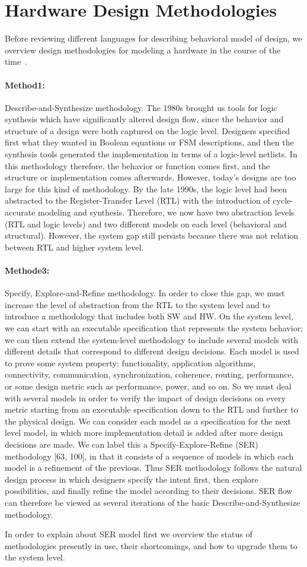 \section{Hardware Design Methodologies}

Before reviewing different languages for describing behavioral model of design, we overview design methodologies for modeling a hardware in the course of the time~\cite{michel_2012_synthesis}.

\paragraph{Method1:} Describe-and-Synthesize methodology.
The 1980s brought us tools for logic synthesis which have significantly altered design flow, since the behavior and structure of a design were both captured on the logic level.
Designers specified first what they wanted in Boolean equations or FSM descriptions, and then the synthesis tools generated the implementation in terms of a logic-level netlists.
In this methodology therefore, the behavior or function comes first, and the structure or implementation comes afterwards.
However, today’s designs are too large for this kind of methodology.
By the late 1990s, the logic level had been abstracted to the Register-Transfer Level (RTL) with the introduction of cycle-accurate modeling and synthesis.
Therefore, we now have two abstraction levels (RTL and logic levels) and two different models on each level (behavioral and structural).
However, the system gap still persists because there was not relation between RTL and higher system level.

\paragraph{Methode3:} Specify, Explore-and-Refine methodology.
In order to close this gap, we must increase the level of abstraction from the RTL to the system level and to introduce a methodology that includes both SW and HW.
On the system level, we can start with an executable specification that represents the system behavior; we can then extend the system-level methodology to include several models with different details
that correspond to different design decisions. Each model is used to prove some system property: functionality, application algorithms, connectivity, communication, synchronization, coherence, routing, performance, or some design metric such as performance, power, and so on.
So we must deal with several models in order to verify the impact of design decisions on every metric starting from an executable specification down to the RTL and further to the physical design.
We can consider each model as a specification for the next level model, in which more implementation detail is added after more design decisions are made.
We can label this a Specify-Explore-Refine (SER) methodology [63, 100], in that it consists of a sequence of models in which each model is a refinement of the previous.
Thus SER methodology follows the natural design process in which designers specify the intent first, then explore possibilities, and finally refine the model according to their decisions.
SER flow can therefore be viewed as several iterations of the basic Describe-and-Synthesize methodology.

In order to explain about SER model first we overview the status of methodologies presently in use, their shortcomings, and how to upgrade them to the system level.

